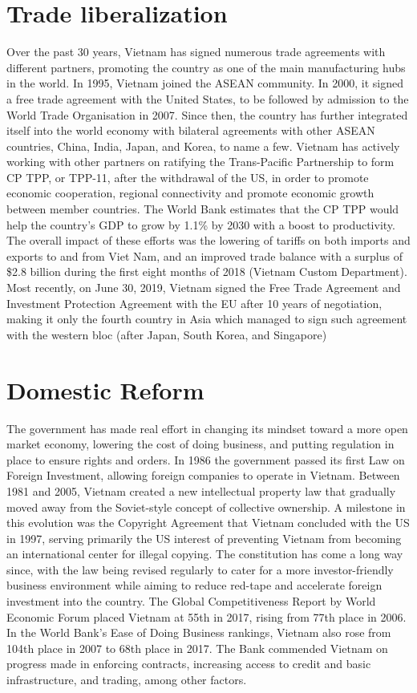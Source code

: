 \documentclass[openany]{book}
\begin{document}
\section{Trade liberalization}
\small{
    Over the past 30 years, Vietnam has signed numerous trade agreements with different partners, promoting the country as one of the main manufacturing hubs in the world. In 1995, Vietnam joined the ASEAN community. In 2000, it signed a free trade agreement with the United States, to be followed by admission to the World Trade Organisation in 2007. Since then, the country has further integrated itself into the world economy with bilateral agreements with other ASEAN countries, China, India, Japan, and Korea, to name a few. Vietnam has actively working with other partners on ratifying the Trans-Pacific Partnership to form CP TPP, or TPP-11, after the withdrawal of the US, in order to promote economic cooperation, regional connectivity and promote economic growth between member countries. The World Bank estimates that the CP TPP would help the country's GDP to grow by 1.1\% by 2030 with a boost to productivity. The overall impact of these efforts was the lowering of tariffs on both imports and exports to and from Viet Nam, and an improved trade balance with a surplus of \$2.8 billion during the first eight months of 2018 (Vietnam Custom Department).\cite{135} Most recently, on June 30, 2019, Vietnam signed the Free Trade Agreement and Investment Protection Agreement with the EU after 10 years of negotiation, making it only the fourth country in Asia which managed to sign such agreement with the western bloc (after Japan, South Korea, and Singapore)
}
\section{Domestic Reform}
The government has made real effort in changing its mindset toward a more open market economy, lowering the cost of doing business, and putting regulation in place to ensure rights and orders. In 1986 the government passed its first Law on Foreign Investment, allowing foreign companies to operate in Vietnam. Between 1981 and 2005, Vietnam created a new intellectual property law that gradually moved away from the Soviet-style concept of collective ownership.\cite{136} A milestone in this evolution was the Copyright Agreement that Vietnam concluded with the US in 1997, serving primarily the US interest of preventing Vietnam from becoming an international center for illegal copying.\cite{136} The constitution has come a long way since, with the law being revised regularly to cater for a more investor-friendly business environment while aiming to reduce red-tape and accelerate foreign investment into the country. The Global Competitiveness Report\cite{137} by World Economic Forum placed Vietnam at 55th in 2017, rising from 77th place in 2006. In the World Bank's Ease of Doing Business rankings,\cite{138} Vietnam also rose from 104th place in 2007 to 68th place in 2017. The Bank commended Vietnam on progress made in enforcing contracts, increasing access to credit and basic infrastructure, and trading, among other factors.
\end{document}
